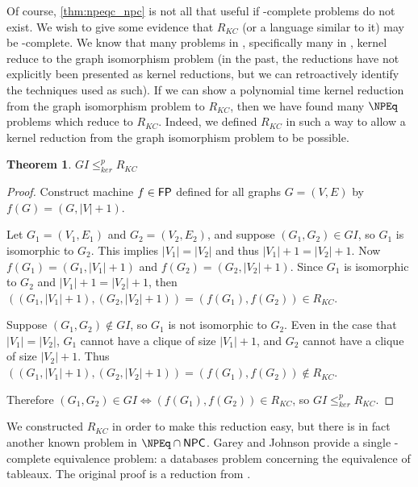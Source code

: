 \documentclass{amsart}
\newtheorem{theorem}{Theorem}[section]
\theoremstyle{definition} \newtheorem{definition}[definition]{Definition}
\newcommand{\kr}{\leq^{p}_{ker}} %
\begin{document}
Of course, \autoref{thm:npeqc_npc} is not all that useful if \NPEq-complete
problems do not exist. We wish to give some evidence that $R_{KC}$ (or a
language similar to it) may be \NPEq-complete. We know that many problems in
\NP, specifically many in \NPEq, kernel reduce to the graph isomorphism problem
(in the past, the reductions have not explicitly been presented as kernel
reductions, but we can retroactively identify the techniques used as such). If
we can show a polynomial time kernel reduction from the graph isomorphism
problem to $R_{KC}$, then we have found many $\NPEq$ problems which reduce to
$R_{KC}$. Indeed, we defined $R_{KC}$ in such a way to allow a kernel reduction
from the graph isomorphism problem to be possible.

\begin{theorem}$GI\kr R_{KC}$\end{theorem}
\begin{proof}
  Construct machine $f\in{\ensuremath{\mathsf{FP}}}$ defined for all graphs $G=(V,E)$ by
  $f(G)=(G,|V|+1)$.

  Let $G_1=(V_1, E_1)$ and $G_2=(V_2, E_2)$, and suppose $(G_1, G_2)\in GI$, so
  $G_1$ is isomorphic to $G_2$. This implies $|V_1|=|V_2|$ and thus
  $|V_1|+1=|V_2|+1$. Now $f(G_1)=(G_1, |V_1|+1)$ and $f(G_2)=(G_2,
  |V_2|+1)$. Since $G_1$ is isomorphic to $G_2$ and $|V_1|+1=|V_2|+1$, then
  $((G_1, |V_1|+1),(G_2, |V_2|+1))=(f(G_1), f(G_2))\in R_{KC}$.
  
  Suppose $(G_1, G_2)\notin GI$, so $G_1$ is not isomorphic to $G_2$. Even in
  the case that $|V_1|=|V_2|$, $G_1$ cannot have a clique of size $|V_1|+1$,
  and $G_2$ cannot have a clique of size $|V_2|+1$. Thus $((G_1, |V_1|+1),
  (G_2, |V_2|+1))=(f(G_1), f(G_2))\notin R_{KC}$.

  Therefore $(G_1, G_2)\in GI\iff (f(G_1), f(G_2))\in R_{KC}$, so $GI\kr
  R_{KC}$.
\end{proof}

We constructed $R_{KC}$ in order to make this reduction easy, but there is in
fact another known problem in $\NPEq\cap\NPC$. Garey and Johnson provide a
single \NP-complete equivalence problem: a databases problem concerning the
equivalence of tableaux.\cite{gj79} The original proof is a reduction from
\TSAT.\cite{asu79}
\end{document}
